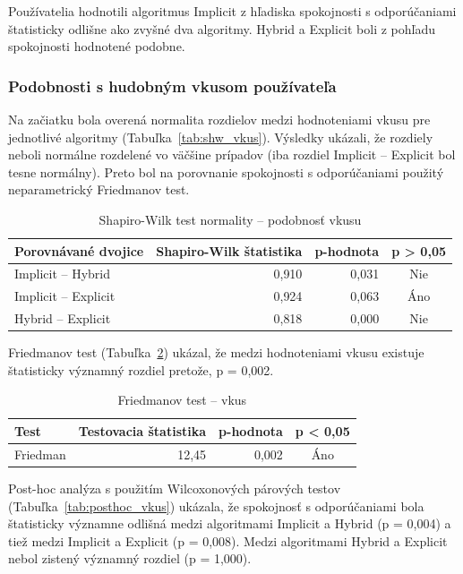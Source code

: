 Používatelia hodnotili algoritmus Implicit z hľadiska spokojnosti s odporúčaniami štatisticky odlišne ako zvyšné dva algoritmy. Hybrid a Explicit boli z pohľadu spokojnosti hodnotené podobne.


\subsubsection{Podobnosti s hudobným vkusom používateľa}
Na začiatku bola overená normalita rozdielov medzi hodnoteniami vkusu pre jednotlivé algoritmy (Tabuľka~\ref{tab:shw_vkus}). Výsledky ukázali, že rozdiely neboli normálne rozdelené vo väčšine prípadov (iba rozdiel Implicit – Explicit bol tesne normálny). Preto bol na porovnanie spokojnosti s odporúčaniami použitý neparametrický Friedmanov test.

\begin{table}[h!]
  \caption{Shapiro-Wilk test normality – podobnosť vkusu}
  \label{tab:shw2}
  \centering
  \begin{tabular}{@{}lrrc@{}}
    \toprule
    \textbf{Porovnávané dvojice} & \textbf{Shapiro-Wilk štatistika} & \textbf{p-hodnota} & \textbf{p > 0{,}05} \\
    \midrule
    Implicit -- Hybrid & 0{,}910 & 0{,}031 & Nie \\
    Implicit -- Explicit & 0{,}924 & 0{,}063 & Áno \\
    Hybrid -- Explicit & 0{,}818 & 0{,}000 & Nie \\
    \bottomrule
  \end{tabular}
\end{table}

Friedmanov test (Tabuľka~\ref{tab:friedman_vkus}) ukázal, že medzi hodnoteniami vkusu existuje štatisticky významný rozdiel pretože, p = 0{,}002.

\begin{table}[h!]
  \caption{Friedmanov test – vkus}
  \label{tab:friedman_vkus}
  \centering
  \begin{tabular}{@{}lrrc@{}}
    \toprule
    \textbf{Test} & \textbf{Testovacia štatistika} & \textbf{p-hodnota} & \textbf{p < 0{,}05} \\
    \midrule
    Friedman & 12{,}45 & 0{,}002 & Áno \\
    \bottomrule
  \end{tabular}
\end{table}

Post-hoc analýza s použitím Wilcoxonových párových testov (Tabuľka~\ref{tab:posthoc_vkus}) ukázala, že spokojnosť s odporúčaniami bola štatisticky významne odlišná medzi algoritmami Implicit a Hybrid (p = 0{,}004) a tiež medzi Implicit a Explicit (p = 0{,}008).
Medzi algoritmami Hybrid a Explicit nebol zistený významný rozdiel (p = 1{,}000).


